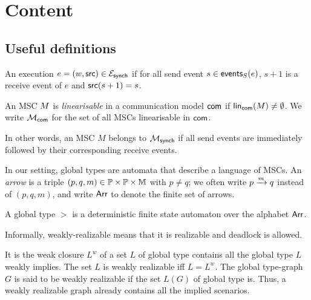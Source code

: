 \section{Content}

\subsection{Useful definitions}

\begin{definition}\label{def:synch}
An execution $\execution=(w,\source) \in \executionsofmodel{\synchmodel}$
if for all send event $s\in\sendeventsof{e}$, $s+1$ is a receive event
of $e$ and $\source(s+1)=s$.
\end{definition}

\begin{definition}\label{def:linearisable-msc}
An MSC $\mmsc$ is \textit{linearisable} in a communication model $\acommunicationmodel$ if  
$\linearisationsof{\mmsc}{\acommunicationmodel}\neq\emptyset$.
We write $\mscsetofmodel{\acommunicationmodel}$ for the set of all MSCs linearisable in $\acommunicationmodel$.
\end{definition}

In other words, an MSC $M$ belongs to $\mscsetofmodel{\synchmodel}$ if
all send events are immediately followed by their corresponding receive events.

In our setting, global types are automata that describe a language of MSCs. 
An \emph{arrow} is a triple $(p,q,m)\in\Procs\times\Procs\times\Messages$ with $p\ne q$;
we often write $\marrow{p}{q}{m}$ instead of $(p,q,m)$, and write $\labelalphabet$
to denote the finite set of arrows.
\begin{definition}
A global type $\gt$ is a deterministic finite state automaton over the alphabet $\labelalphabet$.
\end{definition}

Informally, weakly-realizable means that it is realizable and deadlock is allowed.
\begin{definition}
It is the 
weak closure $L^w$ of a set $L$ of global type contains all the global type $L$ weakly implies.
The set $L$ is weakly realizable iff $L=L^w$. The global type-graph $G$ is said to be weakly
realizable if the set $L(G)$ of global type is. Thus, a weakly realizable graph already contains
all the implied scenarios.
\end{definition}


